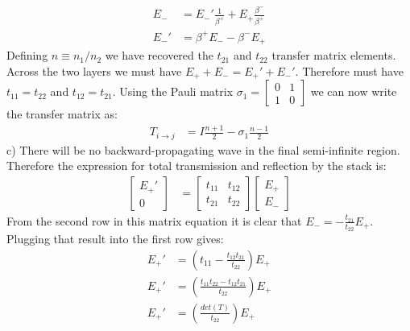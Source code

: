 \documentclass[a4paper,11pt]{article}
\numberwithin{equation}{section}
\newcommand{\lrp}[1]{\left({#1}\right)}
\begin{document}
\begin{align}
 E_- &= E_-'\frac{1}{\beta^+}+E_+\frac{\beta^-}{\beta^+}\\
 E_-' &= \beta^+E_- - \beta^-E_+
\end{align}
Defining $n \equiv n_1/n_2$ we have recovered the $t_{21}$ and $t_{22}$ transfer matrix elements.
Across the two layers we must have $E_++E_- = E_+'+E_-'$. 
Therefore must have $t_{11} = t_{22}$ and $t_{12}=t_{21}$. 
Using the Pauli matrix $\sigma_1 = \begin{bmatrix}0 & 1\\ 1 & 0 \end{bmatrix}$ we can now write the transfer matrix as:
\begin{align}
 T_{i\rightarrow j} &= I\frac{n+1}{2}-\sigma_1 \frac{n-1}{2}
\end{align}
c) There will be no backward-propagating wave in the final semi-infinite region. 
Therefore the expression for total transmission and reflection by the stack is:
\begin{align}
 \begin{bmatrix}E_+' \\ 0 \end{bmatrix} &= \begin{bmatrix}t_{11}&t_{12}\\t_{21}&t_{22} \end{bmatrix} \begin{bmatrix}E_+ \\ E_- \end{bmatrix}
\end{align}
From the second row in this matrix equation it is clear that $E_- = -\frac{t_{21}}{t_{22}}E_+$.
Plugging that result into the first row gives:
\begin{align}
 E_+' &= \lrp{t_{11}-\frac{t_{12}t_{21}}{t_{22}}}E_+\\
 E_+' &= \lrp{\frac{t_{11}t_{22}-t_{12}t_{21}}{t_{22}}}E_+\\
 E_+' &= \lrp{\frac{det(T)}{t_{22}}}E_+\\
\end{align}
\end{document}
